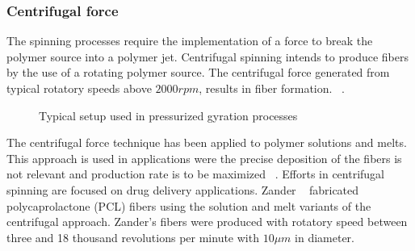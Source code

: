 \subsubsection{Centrifugal force}The spinning processes require the implementation of a force to break the polymer source into a polymer jet. Centrifugal spinning intends to produce fibers by the use of a rotating polymer source. The centrifugal force generated from typical rotatory speeds above $2000 rpm $, results in fiber formation. \unskip~\cite{527120:13535559,527120:13535561}.


\bgroup
\begin{figure}[!htbp]
\centering \makeatletter{}
\makeatother 
\caption{{Typical setup used in pressurized gyration processes}}
\label{f-7cf6ac702e28}
\end{figure}
\egroup
The centrifugal force technique has been applied to polymer solutions and melts. This approach is used in applications were the precise deposition of the fibers is not relevant and production rate is to be maximized \unskip~\cite{527120:13535894}.  Efforts in centrifugal spinning are focused on drug delivery applications. Zander \unskip~\cite{527120:13535977} fabricated polycaprolactone (PCL) fibers using the solution and melt variants of the centrifugal approach. Zander's fibers were produced with rotatory speed between three and 18 thousand revolutions per minute with $10 \mu m $ in diameter. 

